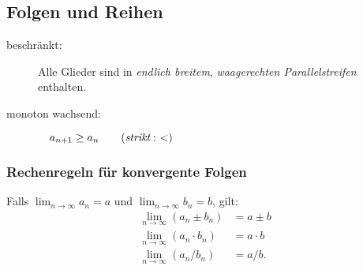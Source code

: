 \subsection{Folgen und Reihen}
    \begin{description}
        \item[beschränkt:] Alle Glieder sind in \emph{endlich breitem}, \emph{waagerechten Parallelstreifen} enthalten.
        \item[monoton wachsend:] $\quad a_{n+1} \geq a_n \qquad  (\emph{strikt}:\,\, <)$
    \end{description}
    \subsubsection{Rechenregeln für konvergente Folgen}
        Falls $\displaystyle \lim_{n\to \infty} a_n = a$ und $\displaystyle \lim_{n\to \infty} b_n = b$, gilt:
        \begin{align*}
            \lim_{n \to \infty}(a_n \pm b_n) &= a \pm b\\
            \lim_{n \to \infty}(a_n \cdot b_n) &= a \cdot b\\
            \lim_{n \to \infty}(a_n / b_n) &= a / b.
        \end{align*}
